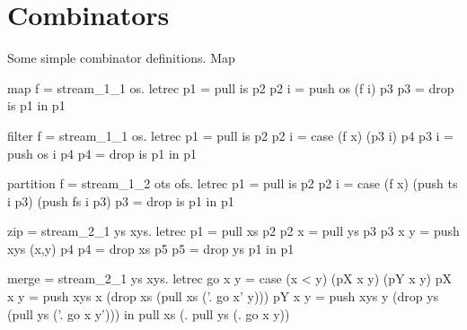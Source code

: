 \appendix
\section{Combinators}
\label{s:Combinators}

Some simple combinator definitions.
Map 

\begin{code}
map f = stream_1_1 \is os.
  letrec
    p1   = pull is p2
    p2 i = push os (f i) p3
    p3   = drop is p1
  in p1
\end{code}

\begin{code}
filter f = stream_1_1 \is os.
  letrec
    p1   = pull is p2
    p2 i = case (f x) (p3 i) p4
    p3 i = push os i p4
    p4   = drop is p1
  in p1
\end{code}

\begin{code}
partition f = stream_1_2 \is ots ofs.
  letrec
    p1   = pull is p2
    p2 i = case (f x)
            (push ts i p3)
            (push fs i p3)
    p3   = drop is p1
  in p1
\end{code}

\begin{code}
zip = stream_2_1 \xs ys xys.
  letrec
    p1     = pull xs        p2
    p2 x   = pull ys        p3
    p3 x y = push xys (x,y) p4
    p4     = drop xs        p5
    p5     = drop ys        p1
  in p1
\end{code}


\begin{code}
merge = stream_2_1 \xs ys xys.
  letrec
    go x y = case (x < y)
             (pX x y)
             (pY x y)
    pX x y = push xys x
            (drop xs
            (pull xs (\x'. go x' y)))
    pY x y = push xys y
            (drop ys
            (pull ys (\y'. go x y')))
  in pull xs (\x. pull ys (\y. go x y))
\end{code}



